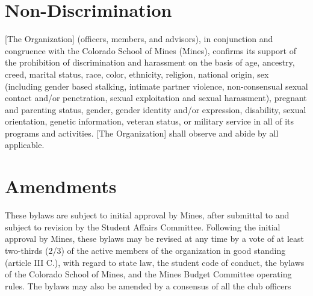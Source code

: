 \documentclass[12pt]{article}
\begin{document}
\section{Non-Discrimination}
{
    [The Organization] (officers, members, and advisors), in conjunction and congruence with the
    Colorado School of Mines (Mines), confirms its support of the prohibition of discrimination and
    harassment on the basis of age, ancestry, creed, marital status, race, color, ethnicity, religion, national
    origin, sex (including gender based stalking, intimate partner violence, non-consensual sexual contact
    and/or penetration, sexual exploitation and sexual harassment), pregnant and parenting status, gender,
    gender identity and/or expression, disability, sexual orientation, genetic information, veteran status, or
    military service in all of its programs and activities. [The Organization] shall observe and abide by all
    applicable.
}

\section{Amendments}
These bylaws are subject to initial approval by Mines, after submittal to and subject to revision by the Student Affairs Committee. 
Following the initial approval by Mines, these bylaws may be revised at any time by a vote of at least two-thirds (2/3) of the active members of the organization in good standing (article III C.), 
with regard to state law, the student code of conduct, the bylaws of the Colorado School of Mines, and the Mines Budget Committee operating rules. 
The bylaws may also be amended by a consensus of all the club officers 
\end{document}
